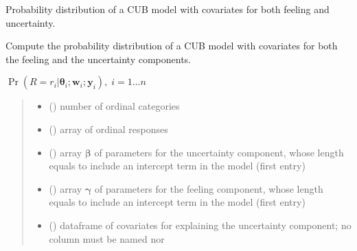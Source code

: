 \documentclass[letterpaper,10pt,english]{sphinxmanual}
\begin{document}
\begin{fulllineitems}
\label{\detokenize{cubmods:cubmods.cub_yw.prob}}
\pysigstartsignatures
{}
\pysigstopsignatures
\sphinxAtStartPar
Probability distribution of a CUB model with covariates for both feeling and uncertainty.

\sphinxAtStartPar
Compute the probability distribution of a CUB model with covariates for both the feeling 
and the uncertainty components.

\sphinxAtStartPar
\(\Pr(R = r_i | \pmb\theta_i ; \pmb w_i; \pmb y_i),\; i=1 \ldots n\)
\begin{quote}\begin{description}
\begin{itemize}
\item {} 
\sphinxAtStartPar
{} () \textendash{} number of ordinal categories

\item {} 
\sphinxAtStartPar
{} () \textendash{} array of ordinal responses

\item {} 
\sphinxAtStartPar
{} () \textendash{} array \(\pmb \beta\) of parameters for the uncertainty component, whose length equals 
 to include an intercept term in the model (first entry)

\item {} 
\sphinxAtStartPar
{} () \textendash{} array \(\pmb \gamma\) of parameters for the feeling component, whose length equals 
 to include an intercept term in the model (first entry)

\item {} 
\sphinxAtStartPar
{} () \textendash{} dataframe of covariates for explaining the uncertainty component;
no column must be named  nor 


\end{itemize}
\end{description}
\end{quote}
\end{fulllineitems}
\end{document}
